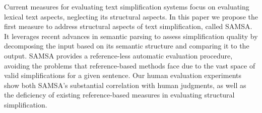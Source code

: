 Current measures for evaluating text simplification systems focus on evaluating lexical text aspects, neglecting its structural aspects. In this paper we propose the first measure to address structural aspects of text simplification, called SAMSA. It leverages recent advances in semantic parsing to assess simplification quality by decomposing the input based on its semantic structure and comparing it to the output. SAMSA provides a reference-less automatic evaluation procedure, avoiding the problems that reference-based methods face due to the vast space of valid simplifications for a given sentence. Our human evaluation experiments show both SAMSA's substantial correlation with human judgments, as well as the deficiency of existing reference-based measures in evaluating structural simplification.
